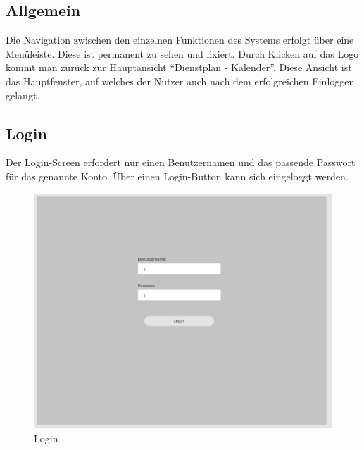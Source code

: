 \documentclass[11pt,
paper=a4,
bibtotocnumbered,	  %
liststotocnumbered,  %
DIV=calc,		  %
tablecaptionabove,	  %
headinclude,
]{article}
\begin{document}
\subsection{Allgemein}
Die Navigation zwischen den einzelnen Funktionen des Systems erfolgt über eine Menüleiste. Diese ist permanent zu sehen und fixiert. Durch Klicken auf das Logo kommt man zurück zur Hauptansicht “Dienstplan - Kalender”. Diese Ansicht ist das Hauptfenster, auf welches der Nutzer auch nach dem erfolgreichen Einloggen gelangt.
\subsection{Login}
Der Login-Screen erfordert nur einen Benutzernamen und das passende Passwort für das genannte Konto. Über einen Login-Button kann sich eingeloggt werden.
\begin{figure}[H]
\includegraphics[width=1\textwidth]{Bilder/Login.jpg}
\caption{Login}
\end{figure}
\end{document}
